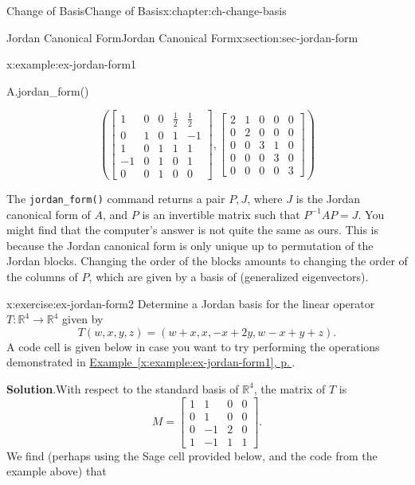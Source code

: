 \documentclass[oneside,10pt,]{book}
\newcommand{\blocktitlefont}{\relax}
\newcommand{\xreffont}{\relax}
\newcommand{\mono}[1]{\texttt{#1}}
\numberwithin{equation}{section}
\newcommand{\bbm}{\begin{bmatrix}}
\newcommand{\ebm}{\end{bmatrix}}
\newcommand{\R}{\mathbb{R}}
\newcommand{\amp}{&}
\begin{document}
\begin{chapterptx}{Change of Basis}{}{Change of Basis}{}{}{x:chapter:ch-change-basis}
\begin{sectionptx}{Jordan Canonical Form}{}{Jordan Canonical Form}{}{}{x:section:sec-jordan-form}
\begin{example}{}{x:example:ex-jordan-form1}
\begin{sageinput}
A.jordan_form()
\end{sageinput}
\begin{sageoutput}
\[\left(\bbm 1\amp 0\amp 0\amp \frac12\amp \frac12\\ 0\amp 1\amp 0\amp 1\amp -1\\
1\amp 0\amp 1\amp 1\amp 1\\-1\amp 0\amp 1\amp 0\amp 1\\0\amp 0\amp 1\amp 0\amp 0\ebm,
\bbm 2\amp 1\amp 0\amp 0\amp 0\\0\amp 2\amp 0\amp 0\amp 0\\
0\amp 0\amp 3\amp 1\amp 0\\0\amp 0\amp 0\amp 3\amp 0\\0\amp 0\amp 0\amp 0\amp 3\ebm\right)\]
\end{sageoutput}
The \mono{jordan\_form()} command returns a pair \(P,J\), where \(J\) is the Jordan canonical form of \(A\), and \(P\) is an invertible matrix such that \(P^{-1}AP=J\). You might find that the computer's answer is not quite the same as ours. This is because the Jordan canonical form is only unique up to permutation of the Jordan blocks. Changing the order of the blocks amounts to changing the order of the columns of \(P\), which are given by a basis of (generalized eigenvectors).%
\end{example}
\begin{inlineexercise}{}{x:exercise:ex-jordan-form2}%
Determine a Jordan basis for the linear operator \(T:\R^4\to\R^4\) given by%
\begin{equation*}
T(w,x,y,z)=(w+x,x,-x+2y,w-x+y+z)\text{.}
\end{equation*}
A code cell is given below in case you want to try performing the operations demonstrated in \hyperref[x:example:ex-jordan-form1]{Example~{\xreffont\ref{x:example:ex-jordan-form1}}, p.\,\pageref{x:example:ex-jordan-form1}}.%
\par\smallskip%
\noindent\textbf{\blocktitlefont Solution}.\label{g:solution:idm45936164559488}{}\hypertarget{g:solution:idm45936164559488}{}\quad{}With respect to the standard basis of \(\R^4\), the matrix of \(T\) is%
\begin{equation*}
M = \bbm 1\amp 1\amp 0\amp 0\\0\amp 1\amp 0\amp 0\\0\amp -1\amp 2\amp 0\\1\amp -1\amp 1\amp 1\ebm\text{.}
\end{equation*}
We find (perhaps using the Sage cell provided below, and the code from the example above) that%

\end{inlineexercise}
\end{sectionptx}
\end{chapterptx}
\end{document}
